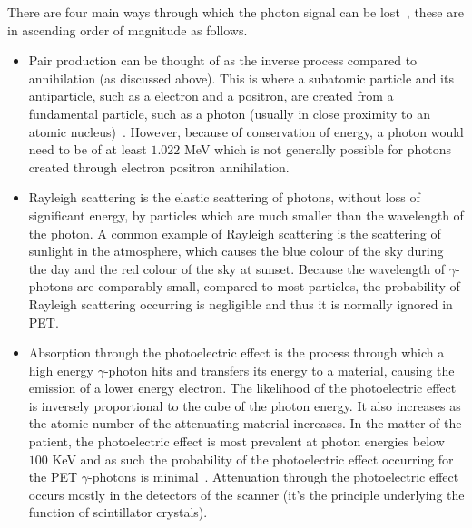                 There are four main ways through which the photon signal can be lost~\parencite{scienceofpetspringer}, these are in ascending order of magnitude as follows.
                
                \begin{itemize}
                    \item Pair production can be thought of as the inverse process compared to annihilation (as discussed above). This is where a subatomic particle and its antiparticle, such as a electron and a positron, are created from a fundamental particle, such as a photon (usually in close proximity to an atomic nucleus)~\parencite{Hubbell2006Electron-positronOverview}. However, because of conservation of energy, a photon would need to be of at least $1.022$ \gls{MeV} which is not generally possible for photons created through electron positron annihilation.
                    
                    \item Rayleigh scattering is the elastic scattering of photons, without loss of significant energy, by particles which are much smaller than the wavelength of the photon. A common example of Rayleigh scattering is the scattering of sunlight in the atmosphere, which causes the blue colour of the sky during the day and the red colour of the sky at sunset. Because the wavelength of $\gamma$-photons are comparably small, compared to most particles, the probability of Rayleigh scattering occurring is negligible and thus it is normally ignored in \gls{PET}.
                    
                    \item Absorption through the photoelectric effect is the process through which a high energy $\gamma$-photon hits and transfers its energy to a material, causing the emission of a lower energy electron. The likelihood of the photoelectric effect is inversely proportional to the cube of the photon energy. It also increases as the atomic number of the attenuating material increases. In the matter of the patient, the photoelectric effect is most prevalent at photon energies below $100$ \gls{KeV} and as such the probability of the photoelectric effect occurring for the \gls{PET} $\gamma$-photons is minimal~\parencite{petspringer}. %
                    Attenuation through the photoelectric effect occurs mostly in the detectors of the scanner (it's the principle underlying the function of scintillator crystals).
                    

\end{itemize}
